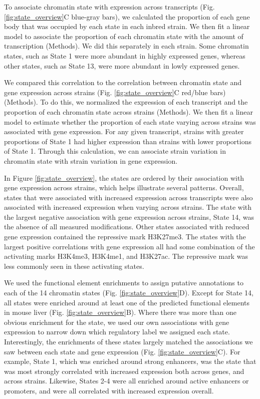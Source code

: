 \documentclass[
  11pt,
]{article}
\begin{document}
To associate chromatin state with expression across transcripts (Fig.
\ref{fig:state_overview}C blue-gray bars), we calculated the proportion
of each gene body that was occupied by each state in each inbred strain.
We then fit a linear model to associate the proportion of each chromatin
state with the amount of transcription (Methods). We did this separately
in each strain. Some chromatin states, such as State 1 were more
abundant in highly expressed genes, whereas other states, such as State
13, were more abundant in lowly expressed genes.

We compared this correlation to the correlation between chromatin state
and gene expression across strains (Fig. \ref{fig:state_overview}C
red/blue bars) (Methods). To do this, we normalized the expression of
each transcript and the proportion of each chromatin state across
strains (Methods). We then fit a linear model to estimate whether the
proportion of each state varying across strains was associated with gene
expression. For any given transcript, strains with greater proportions
of State 1 had higher expression than strains with lower proportions of
State 1. Through this calculation, we can associate strain variation in
chromatin state with strain variation in gene expression.

In Figure \ref{fig:state_overview}, the states are ordered by their
association with gene expression across strains, which helps illustrate
several patterns. Overall, states that were associated with increased
expression across transcripts were also associated with increased
expression when varying across strains. The state with the largest
negative association with gene expression across strains, State 14, was
the absence of all measured modifications. Other states associated with
reduced gene expression contained the repressive mark H3K27me3. The
states with the largest positive correlations with gene expression all
had some combination of the activating marks H3K4me3, H3K4me1, and
H3K27ac. The repressive mark was less commonly seen in these activating
states.

We used the functional element enrichments to assign putative
annotations to each of the 14 chromatin states (Fig.
\ref{fig:state_overview}D). Except for State 14, all states were
enriched around at least one of the predicted functional elements in
mouse liver (Fig. \ref{fig:state_overview}B). Where there was more than
one obvious enrichment for the state, we used our own associations with
gene expression to narrow down which regulatory label we assigned each
state. Interestingly, the enrichments of these states largely matched
the associations we saw between each state and gene expression (Fig.
\ref{fig:state_overview}C). For example, State 1, which was enriched
around strong enhancers, was the state that was most strongly correlated
with increased expression both across genes, and across strains.
Likewise, States 2-4 were all enriched around active enhancers or
promoters, and were all correlated with increased expression overall.
\end{document}
